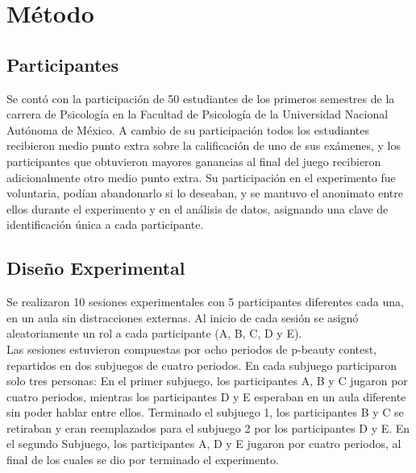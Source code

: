 
\chapter{Método} %

\label{Cap_Exp} %

\section{Participantes}

Se contó con la participación de 50 estudiantes de los primeros semestres de la carrera de Psicología en la Facultad de Psicología de la Universidad Nacional Autónoma de México. A cambio de su participación todos los estudiantes recibieron medio punto extra sobre la  calificación de uno de sus exámenes, y  los participantes que obtuvieron mayores ganancias al final del juego recibieron adicionalmente otro medio punto extra. Su participación en el experimento fue voluntaria, podían abandonarlo si lo deseaban, y se mantuvo el anonimato entre ellos durante el experimento y en el análisis de datos, asignando una clave de identificación única a cada participante.\\

\section{Diseño Experimental}

Se realizaron 10 sesiones experimentales con  5 participantes diferentes cada una, en un aula sin distracciones externas. Al inicio de cada sesión se asignó aleatoriamente un rol a cada participante (A, B, C, D y E).\\

Las sesiones estuvieron compuestas por ocho periodos de p-beauty contest, repartidos en dos subjuegos de cuatro periodos. En cada subjuego participaron solo tres personas: En el primer subjuego, los participantes A, B y C jugaron por cuatro periodos, mientras los participantes D y E esperaban en un aula diferente sin poder hablar entre ellos. Terminado el subjuego 1, los participantes B y C se retiraban y eran reemplazados para el subjuego 2 por los participantes D y E. En el segundo Subjuego, los participantes A, D y E jugaron por cuatro periodos, al final de los cuales se dio por terminado el experimento.\\

